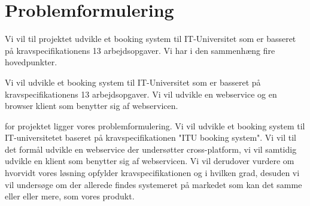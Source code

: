 \section{Problemformulering}
\label{Background_Problem}
Vi vil til projektet udvikle et booking system til IT-Universitet  som er basseret på kravspecifikationens 13 arbejdsopgaver. Vi har i den sammenhæng fire hovedpunkter.
\begin{my_itemize}
\item {}
\item {}
\item {}
\item {}
\item {}
\end{my_itemize}
Vi vil udvikle et booking system til IT-Universitet  som er basseret på kravspecifikationens 13 arbejdsopgaver. Vi vil udvikle en webservice og en browser klient som benytter sig af webservicen.


for projektet ligger vores problemformulering.
Vi vil udvikle et booking system til IT-universitetet baseret på kravspecifikationen "ITU booking system". Vi vil til det formål udvikle en webservice der undersøtter cross-platform, vi vil samtidig udvikle en klient som benytter sig af webservicen. Vi vil derudover vurdere om hvorvidt vores løsning opfylder kravspecifikationen og i hvilken grad, desuden vi vil undersøge om der allerede findes systemeret på markedet som kan det samme eller eller mere, som vores produkt.